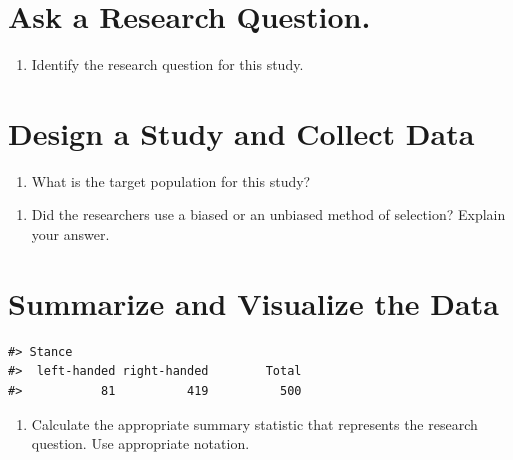 \documentclass[
]{report}
\providecommand{\tightlist}{%
  \setlength{\itemsep}{0pt}\setlength{\parskip}{0pt}}
\begin{document}
\vspace{0.5in}

\hypertarget{ask-a-research-question.}{%
\section{Ask a Research Question.}\label{ask-a-research-question.}}

\begin{enumerate}
\def\labelenumi{\arabic{enumi}.}
\setcounter{enumi}{4}
\tightlist
\item
  Identify the research question for this study.
\end{enumerate}

\vspace{1in}

\hypertarget{design-a-study-and-collect-data}{%
\section{Design a Study and Collect Data}\label{design-a-study-and-collect-data}}

\begin{enumerate}
\def\labelenumi{\arabic{enumi}.}
\setcounter{enumi}{5}
\tightlist
\item
  What is the target population for this study?
\end{enumerate}

\vspace{0.5in}

\begin{enumerate}
\def\labelenumi{\arabic{enumi}.}
\setcounter{enumi}{6}
\tightlist
\item
  Did the researchers use a biased or an unbiased method of selection? Explain your answer.
\end{enumerate}

\vspace{1in}

\hypertarget{summarize-and-visualize-the-data}{%
\section{Summarize and Visualize the Data}\label{summarize-and-visualize-the-data}}

\begin{verbatim}
#> Stance
#>  left-handed right-handed        Total 
#>           81          419          500
\end{verbatim}

\begin{enumerate}
\def\labelenumi{\arabic{enumi}.}
\setcounter{enumi}{7}
\tightlist
\item
  Calculate the appropriate summary statistic that represents the research question. Use appropriate notation.
\end{enumerate}
\end{document}
